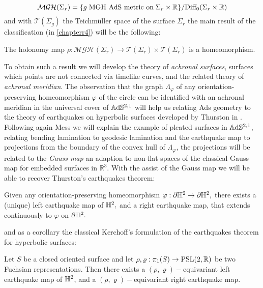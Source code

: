 \[
    \mathcal{MGH}(\Sigma_r)=\{g\;\text{MGH AdS metric on}\;\Sigma_r\times\mathbb{R}\}/\text{Diff}_0(\Sigma_r\times\mathbb{R})
\] and with $\mathcal{T}(\Sigma_g)$ the Teichmüller space of the surface $\Sigma_r$ the main result of the classification (in \ref{chapterr4}) will be the following: 

\begin{theorem}
    The holonomy map $\rho:\mathcal{MGH}(\Sigma_r)\to\mathcal{T}(\Sigma_r)\times\mathcal{T}(\Sigma_r)$ is a homeomorphism.
\end{theorem}

To obtain such a result we will develop the theory of \textit{achronal surfaces}, surfaces which points are not connected via timelike curves, and the related theory of \textit{achronal meridian}. The observation that the graph $\Lambda_\varphi$ of any orientation-preserving homeomorphism $\varphi$ of the circle can be identified with an achronal meridian in the universal cover of $\mathbb{A}\mathrm{d}\mathbb{S}^{2,1}$ will help us relating Ads geometry to the theory of earthquakes on hyperbolic surfaces developed by Thurston in \cite{thurston1986earthquakes}.\\ 

Following again Mess we will explain the example of pleated surfaces in $\mathbb{A}\mathrm{d}\mathbb{S}^{2,1}$, relating bending lamination to geodesic lamination and the earthquake map to projections from the boundary of the convex hull of $\Lambda_\varphi$, the projections will be related to the \textit{Gauss map} an adaption to non-flat spaces of the classical Gauss map for embedded surfaces in $\mathbb{R}^3.$ With the assist of the Gauss map we will be able to recover Thurston's earthquakes theorem: 

\begin{theorem}
    Given any orientation-preserving homeomorphism $\varphi:\partial\mathbb{H}^2\to\partial\mathbb{H}^2,$ there exists a (unique) left earthquake map of $\mathbb{H}^2,$ and a right earthquake map, that extends continuously to $\varphi$ on $\partial\mathbb{H}^2.$
\end{theorem}

and as a corollary the classical Kerchoff's formulation of the earthquakes theorem for hyperbolic surfaces: 

\begin{corollary}
    Let $S$ be a closed oriented surface and let $\rho,\varrho:\pi_1(S)\to\text{PSL}(2,\mathbb{R})$ be two Fuchsian representations. Then there exists a $(\rho,\varrho)-$equivariant left earthquake map of $\mathbb{H}^2$, and a $(\rho,\varrho)-$equivariant right earthquake map. 
\end{corollary}
